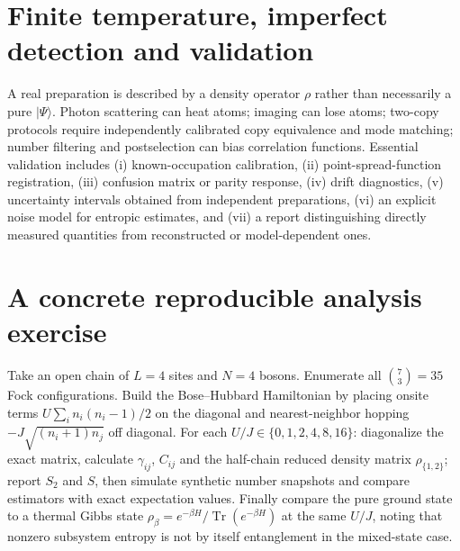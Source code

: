 \documentclass[11pt,a4paper]{article}
\newcommand{\tr}{\operatorname{Tr}}
\begin{document}
\section{Finite temperature, imperfect detection and validation}
A real preparation is described by a density operator $\rho$ rather than necessarily a pure $|\Psi\rangle$. Photon scattering can heat atoms; imaging can lose atoms; two-copy protocols require independently calibrated copy equivalence and mode matching; number filtering and postselection can bias correlation functions. Essential validation includes (i) known-occupation calibration, (ii) point-spread-function registration, (iii) confusion matrix or parity response, (iv) drift diagnostics, (v) uncertainty intervals obtained from independent preparations, (vi) an explicit noise model for entropic estimates, and (vii) a report distinguishing directly measured quantities from reconstructed or model-dependent ones.
\section{A concrete reproducible analysis exercise}
Take an open chain of $L=4$ sites and $N=4$ bosons. Enumerate all $\binom{7}{3}=35$ Fock configurations. Build the Bose--Hubbard Hamiltonian by placing onsite terms $U\sum_i n_i(n_i-1)/2$ on the diagonal and nearest-neighbor hopping $-J\sqrt{(n_i+1)n_j}$ off diagonal. For each $U/J\in\{0,1,2,4,8,16\}$: diagonalize the exact matrix, calculate $\gamma_{ij}$, $C_{ij}$ and the half-chain reduced density matrix $\rho_{\{1,2\}}$; report $S_2$ and $S$, then simulate synthetic number snapshots and compare estimators with exact expectation values. Finally compare the pure ground state to a thermal Gibbs state $\rho_\beta=e^{-\beta H}/\tr(e^{-\beta H})$ at the same $U/J$, noting that nonzero subsystem entropy is not by itself entanglement in the mixed-state case.
\end{document}
